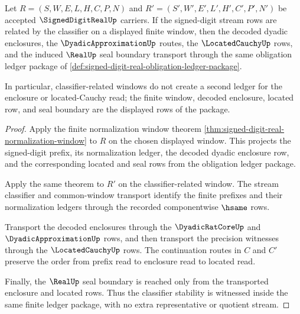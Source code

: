 \begin{theorem}
\label{thm:signed-digit-real-window-classifier-stability}
Let $R=(S,W,E,L,H,C,P,N)$ and $R'=(S',W',E',L',H',C',P',N')$ be accepted $\SignedDigitRealUp$ carriers. If the signed-digit stream rows are related by the classifier on a displayed finite window, then the decoded dyadic enclosures, the $\DyadicApproximationUp$ routes, the $\LocatedCauchyUp$ rows, and the induced $\RealUp$ seal boundary transport through the same obligation ledger package of \autoref{def:signed-digit-real-obligation-ledger-package}.

In particular, classifier-related windows do not create a second ledger for the enclosure or located-Cauchy read; the finite window, decoded enclosure, located row, and seal boundary are the displayed rows of the package.
\end{theorem}
\begin{proof}
Apply the finite normalization window theorem \autoref{thm:signed-digit-real-normalization-window} to $R$ on the chosen displayed window. This projects the signed-digit prefix, its normalization ledger, the decoded dyadic enclosure row, and the corresponding located and seal rows from the obligation ledger package.

Apply the same theorem to $R'$ on the classifier-related window. The stream classifier and common-window transport identify the finite prefixes and their normalization ledgers through the recorded componentwise $\hsame$ rows.

Transport the decoded enclosures through the $\DyadicRatCoreUp$ and $\DyadicApproximationUp$ rows, and then transport the precision witnesses through the $\LocatedCauchyUp$ rows. The continuation routes in $C$ and $C'$ preserve the order from prefix read to enclosure read to located read.

Finally, the $\RealUp$ seal boundary is reached only from the transported enclosure and located rows. Thus the classifier stability is witnessed inside the same finite ledger package, with no extra representative or quotient stream.
\end{proof}


